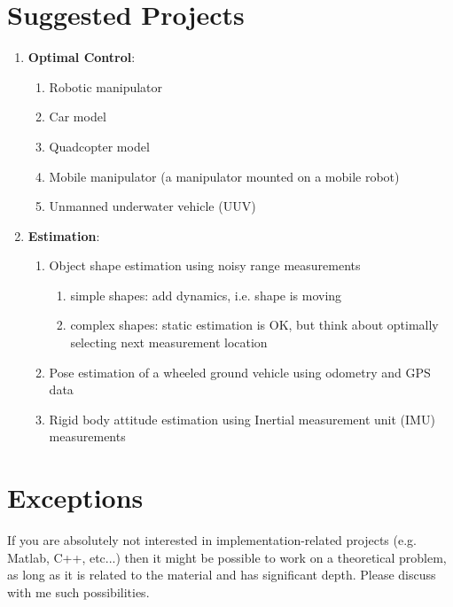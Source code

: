 \documentclass[11pt]{article}
\begin{document}
\section{Suggested Projects}
\begin{enumerate}
\item \textbf{Optimal Control}: 
  \begin{enumerate}
  \item Robotic manipulator
  \item Car model
  \item Quadcopter model
  \item Mobile manipulator (a manipulator mounted on a mobile robot)
  \item Unmanned underwater vehicle (UUV) 
  \end{enumerate}
  
\item \textbf{Estimation}:
  \begin{enumerate}
  \item Object shape estimation using noisy range measurements
  \begin{enumerate}
  \item simple shapes: add dynamics, i.e. shape is moving
  \item complex shapes: static estimation is OK, but think about optimally selecting next measurement location
  \end{enumerate}    
  \item Pose estimation of a wheeled ground vehicle using odometry and GPS data
  \item Rigid body attitude estimation using Inertial measurement unit (IMU) measurements
  \end{enumerate}
\end{enumerate}

\section{Exceptions}
If you are absolutely not interested in implementation-related projects (e.g. Matlab, C++, etc...) then it might be possible to work on a theoretical problem, as long as it is related to the material and has significant depth. Please discuss with me such possibilities.
  
\end{document}
